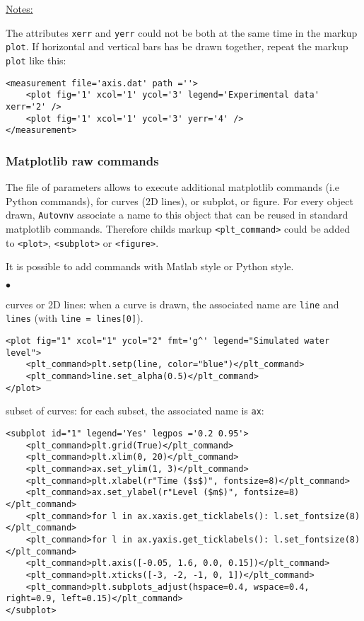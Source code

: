 \documentclass[a4paper,10pt,twoside]{csshortdoc}
\begin{document}
\underline{Notes:}

The attributes \texttt{xerr} and \texttt{yerr} could not be both at the same
time in the markup \texttt{plot}. If horizontal and vertical bars has be
drawn together, repeat the markup \texttt{plot} like this:
\small
\begin{verbatim}
<measurement file='axis.dat' path =''>
    <plot fig='1' xcol='1' ycol='3' legend='Experimental data' xerr='2' />
    <plot fig='1' xcol='1' ycol='3' yerr='4' />
</measurement>
\end{verbatim}
\normalsize

\subsubsection{Matplotlib raw commands}\label{sec:raw}

The file of parameters allows to execute additional matplotlib commands (i.e
Python commands), for curves (2D lines), or subplot, or figure. For every object
drawn, \texttt{Autovnv} associate a name to this object that can be reused in
standard matplotlib commands. Therefore childs markup \texttt{<plt\_command>}
could be added to \texttt{<plot>}, \texttt{<subplot>} or \texttt{<figure>}.

It is possible to add commands with Matlab style or Python style.

\begin{list}{$\bullet$}{}

\item curves or 2D lines: when a curve is drawn, the associated name
are \texttt{line} and \texttt{lines} (with \texttt{line = lines[0]}).

\small
\begin{verbatim}
<plot fig="1" xcol="1" ycol="2" fmt='g^' legend="Simulated water level">
    <plt_command>plt.setp(line, color="blue")</plt_command>
    <plt_command>line.set_alpha(0.5)</plt_command>
</plot>
\end{verbatim}
\normalsize

\item subset of curves: for each subset, the associated name is \texttt{ax}:

\small
\begin{verbatim}
<subplot id="1" legend='Yes' legpos ='0.2 0.95'>
    <plt_command>plt.grid(True)</plt_command>
    <plt_command>plt.xlim(0, 20)</plt_command>
    <plt_command>ax.set_ylim(1, 3)</plt_command>
    <plt_command>plt.xlabel(r"Time ($s$)", fontsize=8)</plt_command>
    <plt_command>ax.set_ylabel(r"Level ($m$)", fontsize=8)</plt_command>
    <plt_command>for l in ax.xaxis.get_ticklabels(): l.set_fontsize(8)</plt_command>
    <plt_command>for l in ax.yaxis.get_ticklabels(): l.set_fontsize(8)</plt_command>
    <plt_command>plt.axis([-0.05, 1.6, 0.0, 0.15])</plt_command>
    <plt_command>plt.xticks([-3, -2, -1, 0, 1])</plt_command>
    <plt_command>plt.subplots_adjust(hspace=0.4, wspace=0.4, right=0.9, left=0.15)</plt_command>
</subplot>
\end{verbatim}
\normalsize

\end{list}
\end{document}
